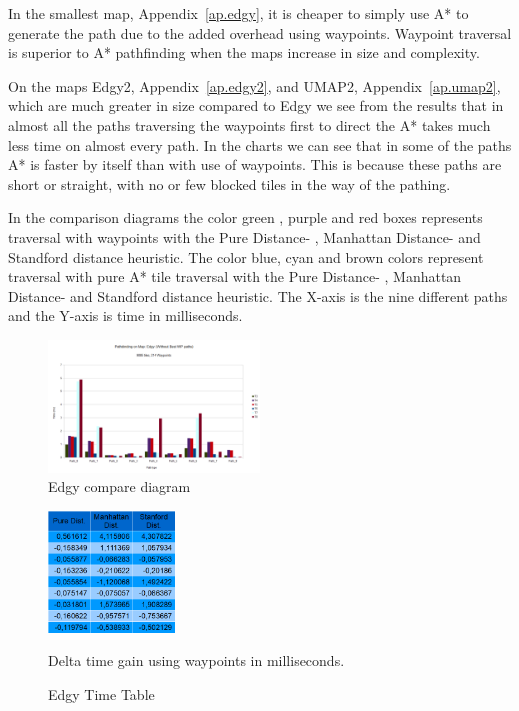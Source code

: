 \documentclass[a4paper]{article}
\begin{document}
In the smallest map, Appendix~\ref{ap.edgy}, it is cheaper to simply use A* to generate the path due to the added overhead using waypoints. Waypoint traversal is superior to A* pathfinding when the maps increase in size and complexity.
	
On the maps Edgy2, Appendix~\ref{ap.edgy2}, and UMAP2, Appendix~\ref{ap.umap2}, which are much greater in size compared to Edgy we see from the results that in almost all the paths traversing the waypoints first to direct the A* takes much less time on almost every path. In the charts we can see that in some of the paths
A* is faster by itself than with use of waypoints. This is because these paths are short or straight, with no or few blocked tiles in the way of the pathing.
		
In the comparison diagrams the color green , purple and red boxes represents traversal with waypoints with the Pure Distance- , Manhattan Distance- and Standford distance heuristic.
The color blue, cyan and brown colors represent traversal with pure A* tile traversal with the Pure Distance- , Manhattan Distance- and Standford distance heuristic.
The  X-axis is the nine different paths and the Y-axis is time in milliseconds.

\begin{figure}[h!]
\centering
\includegraphics[width=0.5\textwidth,height=\textheight,keepaspectratio]{ChartsAndFigures/Edgy_d2.png}
\caption{Edgy compare diagram}
\label{fig:Edgy_d2}
\end{figure}
\begin{figure}[h!]
\centering
\includegraphics[width=0.3\textwidth,height=\textheight,keepaspectratio]{ChartsAndFigures/Edgy_timeTable.png}
\caption{Edgy Time Table}
Delta time gain using waypoints in milliseconds.
\label{fig:Edgy_cd}
\end{figure}
\end{document}
